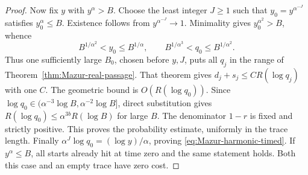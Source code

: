 \begin{proof}
Now fix \(y\) with \(y^\alpha>B\).
Choose the least integer \(J\ge1\) such that
\(y_0=y^{\alpha^{-J}}\) satisfies \(y_0^\alpha\le B\).
Existence follows from \(y^{\alpha^{-J}}\to1\).
Minimality gives \(y_0^{\alpha^2}>B\), whence
\[
 B^{1/\alpha^2}<y_0\le B^{1/\alpha},\qquad
 B^{1/\alpha^3}<q_0\le B^{1/\alpha^2}.
\]
Thus one sufficiently large \(B_0\), chosen before \(y,J\), puts
all \(q_j\) in the range of Theorem~\ref{thm:Mazur-real-passage}.
That theorem gives \(d_j+s_j\le C R(\log q_j)\) with one \(C\).
The geometric bound is \(O(R(\log q_0))\).
Since \(\log q_0\in(\alpha^{-3}\log B,\alpha^{-2}\log B]\),
direct substitution gives
\(R(\log q_0)\le\alpha^{3b}R(\log B)\) for large \(B\).
The denominator \(1-r\) is fixed and strictly positive.
This proves the probability estimate, uniformly in the trace length.
Finally \(\alpha^J\log q_0=(\log y)/\alpha\), proving
\eqref{eq:Mazur-harmonic-timed}.
If \(y^\alpha\le B\), all starts already hit at time zero and the
same statement holds. Both this case and an empty trace have zero cost.
\end{proof}

